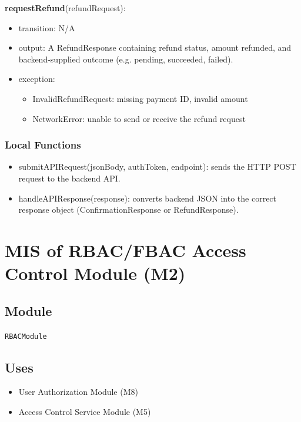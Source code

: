 \documentclass[12pt, titlepage]{article}
\begin{document}
\vspace{0.2cm}

\noindent \textbf{requestRefund}(refundRequest):

\begin{itemize}
    \item transition: N/A
    \item output: A RefundResponse containing refund status, amount refunded,  
    and backend-supplied outcome (e.g. pending, succeeded, failed).
    \item exception:
        \begin{itemize}
            \item InvalidRefundRequest: missing payment ID, invalid amount  
            \item NetworkError: unable to send or receive the refund request
        \end{itemize}
\end{itemize}

\subsubsection{Local Functions}

\begin{itemize}
    \item submitAPIRequest(jsonBody, authToken, endpoint): sends the HTTP POST request to the backend API.
    \item handleAPIResponse(response): converts backend JSON into the correct response object 
          (ConfirmationResponse or RefundResponse).
\end{itemize}

\section{MIS of RBAC/FBAC Access Control Module (M2)} 

\subsection{Module}

\texttt{RBACModule}

\subsection{Uses}

\begin{itemize}
    \item User Authorization Module (M8)
    \item Access Control Service Module (M5)
\end{itemize}
\end{document}
